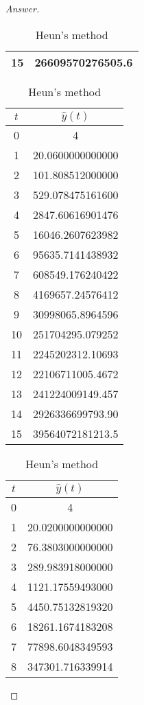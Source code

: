 \begin{proof}[Answer]
\begin{table}[H]
\begin{table}[htbp]
\begin{subtable}[t]{0.32\textwidth}
\begin{tabular}[t]{|c|c|}
		15	&	26609570276505.6	\\	\hline
		\end{tabular}
		\caption{2\(^\text{nd}\) order Taylor's method}
	\end{subtable}
	\begin{subtable}[t]{0.32\textwidth}
		\centering
		\begin{tabular}[t]{|c|c|}
		\hline
		\(t\)	&	\(\hat{y}(t)\)	\\	\hline
		0	&	4					\\	\hline
		1	&	20.0600000000000	\\	\hline
		2	&	101.808512000000	\\	\hline
		3	&	529.078475161600	\\	\hline
		4	&	2847.60616901476	\\	\hline
		5	&	16046.2607623982	\\	\hline
		6	&	95635.7141438932	\\	\hline
		7	&	608549.176240422	\\	\hline
		8	&	4169657.24576412	\\	\hline
		9	&	30998065.8964596	\\	\hline
		10	&	251704295.079252	\\	\hline
		11	&	2245202312.10693	\\	\hline
		12	&	22106711005.4672	\\	\hline
		13	&	241224009149.457	\\	\hline
		14	&	2926336699793.90	\\	\hline
		15	&	39564072181213.5	\\	\hline
		\end{tabular}
		\caption{Heun's method}
	\end{subtable}
	\begin{subtable}[t]{0.32\textwidth}
		\centering
		\begin{tabular}[t]{|c|c|}
		\hline
		\(t\)	&	\(\hat{y}(t)\)	\\	\hline
		0	&	4					\\	\hline
		1	&	20.0200000000000	\\	\hline
		2	&	76.3803000000000	\\	\hline
		3	&	289.983918000000	\\	\hline
		4	&	1121.17559493000	\\	\hline
		5	&	4450.75132819320	\\	\hline
		6	&	18261.1674183208	\\	\hline
		7	&	77898.6048349593	\\	\hline
		8	&	347301.716339914	\\	\hline

\end{tabular}
\end{subtable}
\end{table}
\end{table}
\end{proof}
